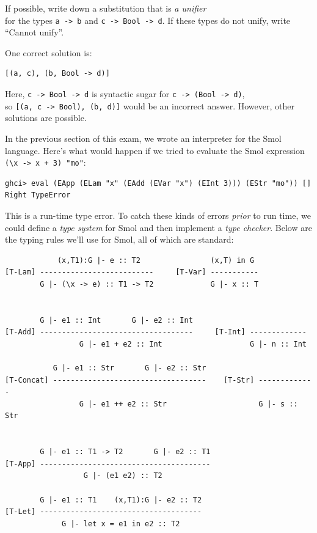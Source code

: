 \documentclass[addpoints]{exam}
\begin{document}
\begin{questions}
\question[4] If possible, write down a substitution that is \emph{a unifier} \\ for the types \texttt{a -> b} and \texttt{c -> Bool -> d}.   If these types do not unify, write ``Cannot unify''.

\begin{solutionorbox}[1in]
One correct solution is:
\begin{verbatim}
[(a, c), (b, Bool -> d)]
\end{verbatim}
Here, \verb|c -> Bool -> d| is syntactic sugar for \verb|c -> (Bool -> d)|, \\
so \verb|[(a, c -> Bool), (b, d)]| would be an incorrect answer. However, other solutions are possible.
\end{solutionorbox}

\question In the previous section of this exam, we wrote an interpreter for the Smol language.  Here's what would happen if we tried to evaluate the Smol expression \verb|(\x -> x + 3) "mo"|:

\begin{verbatim}
ghci> eval (EApp (ELam "x" (EAdd (EVar "x") (EInt 3))) (EStr "mo")) []
Right TypeError
\end{verbatim}

This is a run-time type error.  To catch these kinds of errors \emph{prior} to run time, we could define a \emph{type system} for Smol and then implement a \emph{type checker}.  Below are the typing rules we'll use for Smol, all of which are standard:

{\small
\begin{verbatim}
            (x,T1):G |- e :: T2                (x,T) in G                
[T-Lam] --------------------------     [T-Var] -----------
        G |- (\x -> e) :: T1 -> T2             G |- x :: T


        G |- e1 :: Int       G |- e2 :: Int
[T-Add] -----------------------------------     [T-Int] -------------
                 G |- e1 + e2 :: Int                    G |- n :: Int

           G |- e1 :: Str       G |- e2 :: Str
[T-Concat] -----------------------------------    [T-Str] -------------
                 G |- e1 ++ e2 :: Str                     G |- s :: Str


        G |- e1 :: T1 -> T2       G |- e2 :: T1
[T-App] ---------------------------------------
                  G |- (e1 e2) :: T2
                             
        G |- e1 :: T1    (x,T1):G |- e2 :: T2
[T-Let] -------------------------------------
             G |- let x = e1 in e2 :: T2
\end{verbatim}
}


\end{questions}
\end{document}
